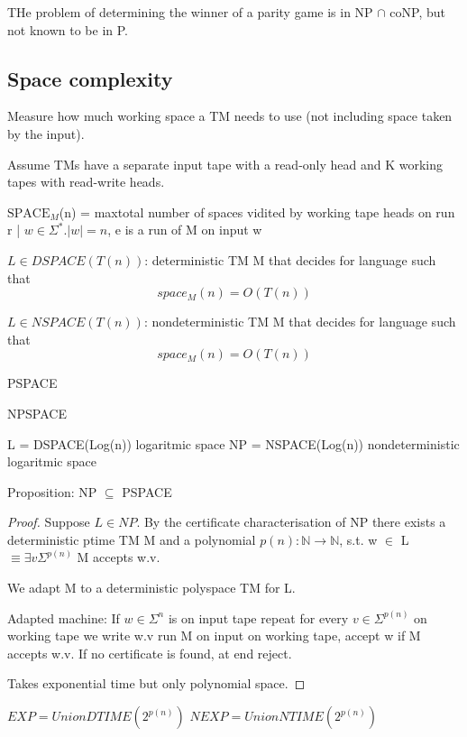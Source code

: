 \documentclass[a4paper,12pt]{article}
\theoremstyle{definition}
\theoremstyle{remark}
\newcommand{\N}{\mathbb{N}}
\begin{document}
THe problem of determining the winner of a parity game is in NP $\cap$ coNP, but not known to be in P.

\subsection{Space complexity}

Measure how much working space a TM needs to use (not including space taken by the input).

Assume TMs have a separate input tape with a read-only head and K working tapes with read-write heads.

$\text{SPACE}_M$(n) = max{total number of spaces vidited by working tape heads on  run r | $w \in \Sigma^*. |w| = n$, e is a run of M on input w}

$L \in DSPACE(T(n))$: deterministic TM M that decides for language such that 
\begin{equation*}
    space_M (n) = O(T(n))
\end{equation*}

$L \in NSPACE(T(n))$: nondeterministic TM M that decides for language such that
\begin{equation*}
    space_M (n) = O(T(n))
\end{equation*}

PSPACE

NPSPACE

L = DSPACE(Log(n)) logaritmic space
NP = NSPACE(Log(n)) nondeterministic logaritmic space


Proposition: NP $\subseteq$ PSPACE

\begin{proof}
    Suppose $L \in NP$. By the certificate characterisation of NP there exists a deterministic ptime TM M
    and a polynomial $p(n): \N \to \N$, s.t. w $\in$ L $\equiv \exists v \Sigma^{p(n)}$ M accepts w.v.

    We adapt M to a deterministic polyspace TM for L.

    Adapted machine:
    If $w \in \Sigma^n$ is on input tape repeat for every $v \in \Sigma^{p(n)}$ on working tape we write w.v run M on input on working tape, accept 
    w if M accepts w.v. If no certificate is found, at end reject.

    Takes exponential time but only polynomial space.
\end{proof}



$EXP = Union DTIME(2^{p(n)})$
$NEXP = Union NTIME(2^{p(n)})$
\end{document}
